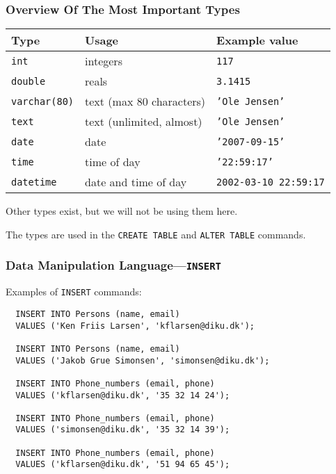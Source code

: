 \documentclass[dvipsnames,handout]{beamer}
\begin{document}
\begin{frame}
\frametitle{Overview Of The Most Important \sql{} Types}

\begin{center}
\begin{tabular}{@{}lll@{}}\hline\hline
\textbf{Type}        & \textbf{Usage} & \textbf{Example value}\\\hline
\texttt{int}         & integers & \texttt{117}\\
\texttt{double}      & reals & \texttt{3.1415}\\
\texttt{varchar(80)} & text (max 80 characters) & \texttt{'Ole
  Jensen'}\\
\texttt{text}        & text (unlimited, almost) & \texttt{'Ole Jensen'}\\
\texttt{date}        & date & \texttt{'2007-09-15'}\\
\texttt{time}        & time of day & \texttt{'22:59:17'}\\
\texttt{datetime}    & date and time of day & \texttt{2002-03-10 22:59:17}\\\hline\hline
\end{tabular}
\end{center}

Other types exist, but we will not be using them here.

The types are used in the \texttt{CREATE TABLE} and \texttt{ALTER
  TABLE} commands.
 
\end{frame}

\begin{frame}[fragile=singleslide]
\frametitle{Data Manipulation Language---\texttt{INSERT}} 

Examples of \texttt{INSERT} commands:

\begin{small}
\begin{verbatim}
  INSERT INTO Persons (name, email)
  VALUES ('Ken Friis Larsen', 'kflarsen@diku.dk');

  INSERT INTO Persons (name, email)
  VALUES ('Jakob Grue Simonsen', 'simonsen@diku.dk');

  INSERT INTO Phone_numbers (email, phone)
  VALUES ('kflarsen@diku.dk', '35 32 14 24');

  INSERT INTO Phone_numbers (email, phone)
  VALUES ('simonsen@diku.dk', '35 32 14 39');

  INSERT INTO Phone_numbers (email, phone)
  VALUES ('kflarsen@diku.dk', '51 94 65 45');
\end{verbatim}
\end{small}

\end{frame}
\end{document}
